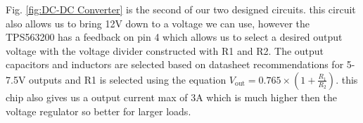 Fig. \ref{fig:DC-DC Converter} is the second of our two designed circuits. this circuit also allows us to bring 12V down to a voltage we can use, however the TPS563200 has a feedback on pin 4 which allows us to select a desired output voltage with the voltage divider constructed with R1 and R2. The output capacitors and inductors are selected based on datasheet recommendations for 5-7.5V outputs and R1 is selected using the equation $V_{\text{out}} = 0.765 \times \left(1 + \frac{R_1}{R_2}\right)$. this chip also gives us a output current max of 3A which is much higher then the voltage regulator so better for larger loads.